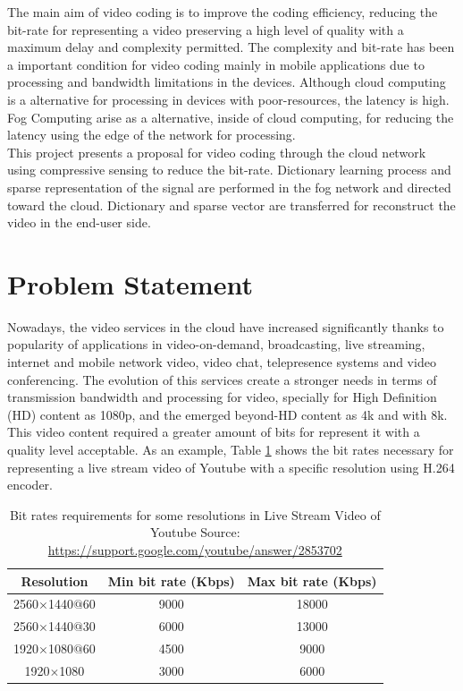 The main aim of video coding is to improve the coding efficiency, reducing the bit-rate for representing a video preserving a high level of quality with a maximum delay and complexity permitted. The complexity and bit-rate has been a important condition for video coding mainly in mobile applications due to processing and bandwidth limitations in the devices. Although cloud computing is a alternative for processing in devices with poor-resources, the latency is high. Fog Computing arise as a alternative, inside of cloud computing, for reducing the latency using the edge of the network for processing. \\

This project presents a proposal for video coding through the cloud network using compressive sensing to reduce the bit-rate. Dictionary learning process and sparse representation of the signal are performed in the fog network and directed toward the cloud. Dictionary and sparse vector are transferred for reconstruct the video  in the end-user side.

\section{Problem Statement}

Nowadays, the video services in the cloud have increased significantly thanks to popularity of applications in video-on-demand, broadcasting, live streaming, internet and mobile network video, video chat, telepresence systems and video conferencing. The evolution of this services create a stronger needs in terms of transmission bandwidth and processing for video, specially for High Definition (HD) content as 1080p, and the emerged beyond-HD content as 4k and with 8k. This video content required a greater amount of bits for represent it with a quality level acceptable. As an example, Table \ref{fig:youtube} shows the bit rates necessary for representing a live stream video of Youtube with a specific resolution using H.264 encoder. 

\begin{table}[!h]
\centering
\begin{tabular}{|c|c|c|}
\hline
\textbf{Resolution} & \textbf{Min bit rate (Kbps)} & \textbf{Max bit rate (Kbps)} \\
\hline
2560$\times$1440$@$60 & 9000 & 18000 \\
\hline
2560$\times$1440$@$30 &  6000 & 13000  \\
\hline
1920$\times$1080$@$60 & 4500 & 9000\\
\hline
1920$\times$1080 & 3000 & 6000 \\
\hline
\end{tabular}
\caption[Bit rates requirements for some resolutions in Live Stream Video of Youtube]{Bit rates requirements for some resolutions in Live Stream Video of Youtube \scriptsize{Source: \url{https://support.google.com/youtube/answer/2853702}}}
\label{fig:youtube}
\end{table}

